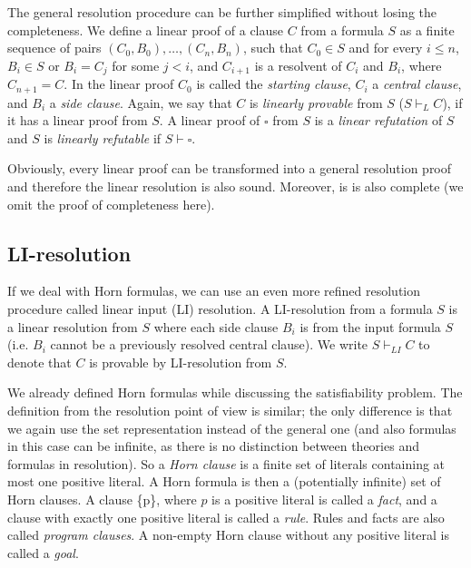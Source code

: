 The general resolution procedure can be further simplified without losing the completeness. We define a linear proof of a clause $C$ from a formula $S$ as a finite sequence of pairs $(C_0, B_0), \dots, (C_n, B_n)$, such that $C_0 \in S$ and for every $i \leq n$, $B_i \in S$ or $B_i = C_j$ for some $j < i$, and $C_{i+1}$ is a resolvent of $C_i$ and $B_i$, where $C_{n+1} = C$. In the linear proof $C_0$ is called the \emph{starting clause}, $C_i$ a \emph{central clause}, and $B_i$ a \emph{side clause}. Again, we say that $C$ is \emph{linearly provable} from $S$ ($S \vdash_L C$), if it has a linear proof from $S$. A linear proof of $\square$ from $S$ is a \emph{linear refutation} of $S$ and $S$ is \emph{linearly refutable} if $S \vdash \square$.

Obviously, every linear proof can be transformed into a general resolution proof and therefore the linear resolution is also sound. Moreover, is is also complete (we omit the proof of completeness here).


\subsection{LI-resolution}

If we deal with Horn formulas, we can use an even more refined resolution procedure called linear input (LI) resolution. A LI-resolution from a formula $S$ is a linear resolution from $S$ where each side clause $B_i$ is from the input formula $S$ (i.e. $B_i$ cannot be a previously resolved central clause). We write $S \vdash_{LI} C$ to denote that $C$ is provable by LI-resolution from $S$.

We already defined Horn formulas while discussing the satisfiability problem. The definition from the resolution point of view is similar; the only difference is that we again use the set representation instead of the general one (and also formulas in this case can be infinite, as there is no distinction between theories and formulas in resolution). So a \emph{Horn clause} is a finite set of literals containing at most one positive literal. A Horn formula is then a (potentially infinite) set of Horn clauses. A clause \{p\}, where $p$ is a positive literal is called a \emph{fact}, and a clause with exactly one positive literal is called a \emph{rule}. Rules and facts are also called \emph{program clauses}. A non-empty Horn clause without any positive literal is called a \emph{goal}.

